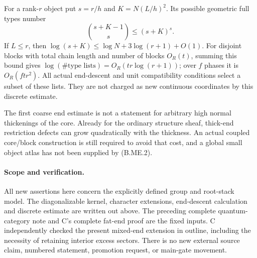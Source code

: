 For a rank-$r$ object put $s=r/h$ and $K=N(L/h)^2$.  Its possible
geometric full types number
\[
             \binom{s+K-1}{s}\le(s+K)^s.                \tag{B.ME.2}
\]
If $L\le r$, then
$\log(s+K)\le\log N+3\log(r+1)+O(1)$.
For disjoint blocks with total chain length and number of blocks
$O_R(t)$, summing this bound gives
$\log(\#\text{type lists})=O_R(tr\log(r+1))$;
over $f$ phases it is $O_R(ftr^2)$.
All actual end-descent and unit compatibility conditions select a
subset of these lists.  They are not charged as new continuous
coordinates by this discrete estimate.

The first coarse end estimate is not a statement for arbitrary
high normal thickenings of the core.  Already for the ordinary
structure sheaf, thick-end restriction defects can grow quadratically
with the thickness.  An actual coupled core/block construction is
still required to avoid that cost, and a global small object atlas
has not been supplied by (B.ME.2).

\paragraph{Scope and verification.}
All new assertions here concern the explicitly defined group and
root-stack model.  The diagonalizable kernel, character extensions,
end-descent calculation and discrete estimate are written out above.
The preceding complete quantum-category note and C's complete fat-end
proof are the fixed inputs.  C independently checked the present
mixed-end extension in outline, including the necessity of retaining
interior excess sectors.  There is no new external source claim,
numbered statement, promotion request, or main-gate movement.
